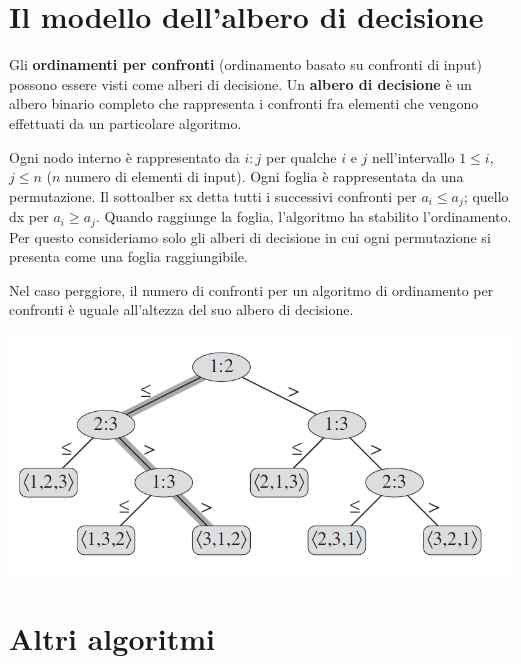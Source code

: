 \documentclass[11pt,a4paper]{article}
\begin{document}
\section{Il modello dell’albero di decisione}
Gli \textbf{ordinamenti per confronti} (ordinamento basato su confronti di input) possono essere visti come alberi di decisione. Un \textbf{albero di decisione} è un albero binario completo che rappresenta i confronti fra elementi che vengono effettuati da un particolare algoritmo.

Ogni nodo interno è rappresentato da $i:j$ per qualche $i$ e $j$ nell’intervallo $1 \leq i$, $j \leq n$ ($n$ numero di elementi di input). Ogni foglia è rappresentata da una permutazione. Il sottoalber sx detta tutti i successivi confronti per $a_i \leq a_j$; quello dx per $a_i \geq a_j$.
Quando raggiunge la foglia, l’algoritmo ha stabilito l’ordinamento. Per questo consideriamo solo gli alberi di decisione in cui ogni permutazione si presenta come una foglia raggiungibile.

Nel caso perggiore, il numero di confronti per un algoritmo di ordinamento per confronti è uguale all’altezza del suo albero di decisione.
\begin{center}
      \includegraphics[scale=0.35]{img/alberodidecisione.png}
\end{center}

\section{Altri algoritmi}
\end{document}
